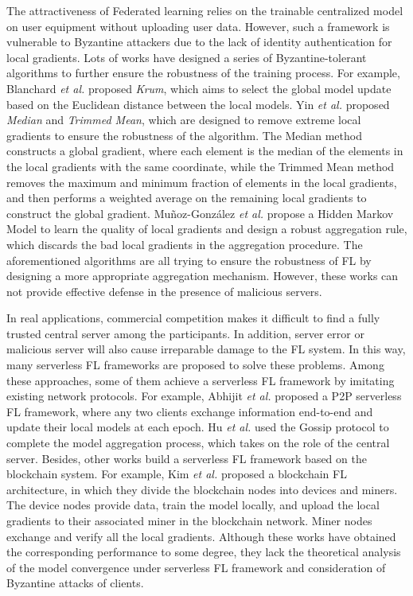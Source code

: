 \documentclass[10pt,journal,compsoc]{IEEEtran}
\newcommand{\etal}{\emph{et al.} }
\begin{document}
The attractiveness of Federated learning relies on the trainable centralized model on user equipment without uploading user data. However, such a framework is vulnerable to Byzantine attackers due to the lack of identity authentication for local gradients. Lots of works have designed a series of Byzantine-tolerant algorithms to further ensure the robustness of the training process. For example, Blanchard \etal \cite{Blanchard2017Byzantine} proposed \textit{Krum}, which aims to select the global model update based on the Euclidean distance between the local models. Yin \etal \cite{pmlr-v80-yin18a} proposed \textit{Median} and \textit{Trimmed Mean}, which are designed to remove extreme local gradients to ensure the robustness of the algorithm. The Median method constructs a global gradient, where each element is the median of the elements in the local gradients with the same coordinate, while the Trimmed Mean method removes the maximum and minimum fraction of elements in the local gradients, and then performs a weighted average on the remaining local gradients to construct the global gradient. Muñoz-González \etal \cite{munozgonzalez2019byzantinerobust} propose a Hidden Markov Model to learn the quality of local gradients and design a robust aggregation rule, which discards the bad local gradients in the aggregation procedure. The aforementioned algorithms are all trying to ensure the robustness of FL by designing a more appropriate aggregation mechanism. However, these works can not provide effective defense in the presence of malicious servers. 

In real applications, commercial competition makes it difficult to find a fully trusted central server among the participants. In addition, server error or malicious server will also cause irreparable damage to the FL system. In this way, many serverless FL frameworks are proposed to solve these problems. Among these approaches, some of them achieve a serverless FL framework by imitating existing network protocols. For example, Abhijit \etal \cite{roy2019braintorrent} proposed a P2P serverless FL framework, where any two clients exchange information end-to-end and update their local models at each epoch. Hu \etal \cite{hu2019decentralized} used the Gossip protocol to complete the model aggregation process, which takes on the role of the central server. Besides, other works build a serverless FL framework based on the blockchain system. For example, Kim \etal \cite{8733825} proposed a blockchain FL architecture, in which they divide the blockchain nodes into devices and miners. The device nodes provide data, train the model locally, and upload the local gradients to their associated miner in the blockchain network. Miner nodes exchange and verify all the local gradients. Although these works have obtained the corresponding performance to some degree, they lack the theoretical analysis of the model convergence under serverless FL framework and consideration of Byzantine attacks of clients. 
\end{document}
